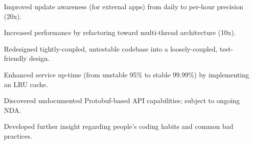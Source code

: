 \documentclass[9pt,a4paper]{extarticle}
\begin{document}
\begin{customitemize}
    \item {}
    \begin{customitemize}
        \item {}
        \begin{customitemize}
            \item[] {}
            \item{Improved update awareness (for external apps) from daily to per-hour precision (20x).}
            \item{Increased performance by refactoring toward multi-thread architecture (10x).}
            \item{Redesigned tightly-coupled, untestable codebase into a loosely-coupled, test-friendly design.}
            \item{Enhanced service up-time (from unstable 95\% to stable 99.99\%) by implementing an LRU cache.}
        \end{customitemize}
        \item {}
        \begin{customitemize}
            \item[] {}
            \item{Discovered undocumented Protobuf-based API capabilities; subject to ongoing NDA.}
        \end{customitemize}
        \item {}
        \begin{customitemize}
            \item[] {}
            \item{Developed further insight regarding people's coding habits and common bad practices.}
        \end{customitemize}
    \end{customitemize}


\end{customitemize}
\end{document}
